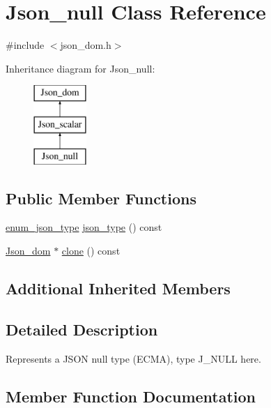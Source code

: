\hypertarget{classJson__null}{}\section{Json\+\_\+null Class Reference}
\label{classJson__null}


{\ttfamily \#include $<$json\+\_\+dom.\+h$>$}

Inheritance diagram for Json\+\_\+null\+:\begin{figure}[H]
\begin{center}
\leavevmode
\includegraphics[height=3.000000cm]{classJson__null}
\end{center}
\end{figure}
\subsection*{Public Member Functions}
\begin{DoxyCompactItemize}
\item 
\mbox{\hyperlink{classJson__dom_af37eed7dfe1da1d6507d3ab85320eb03}{enum\+\_\+json\+\_\+type}} \mbox{\hyperlink{classJson__null_a84d38b413a4894f8d8b214cdbb692974}{json\+\_\+type}} () const
\item 
\mbox{\hyperlink{classJson__dom}{Json\+\_\+dom}} $\ast$ \mbox{\hyperlink{classJson__null_a4d3a0b51950099648e5f7a773b386d49}{clone}} () const
\end{DoxyCompactItemize}
\subsection*{Additional Inherited Members}


\subsection{Detailed Description}
Represents a J\+S\+ON null type (E\+C\+MA), type J\+\_\+\+N\+U\+LL here. 

\subsection{Member Function Documentation}
\mbox{\label{classJson__null_a4d3a0b51950099648e5f7a773b386d49}} 
